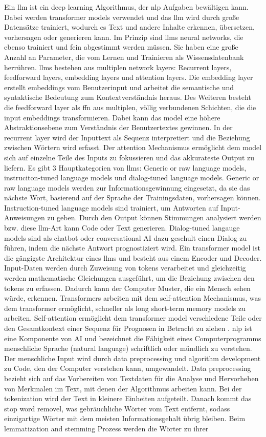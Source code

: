 Ein \gls{llm} ist ein deep learning Algorithmus, der \gls{nlp} Aufgaben bewältigen kann. Dabei werden transformer models verwendet und das \gls{llm} wird durch große Datensätze trainiert, wodurch es Text und andere Inhalte erkennen, übersetzen, vorhersagen oder generieren kann. Im Prinzip sind \gls{llm}s neural networks, die ebenso trainiert und fein abgestimmt werden müssen. Sie haben eine große Anzahl an Parameter, die vom Lernen und Trainieren als Wissensdatenbank herrühren. \gls{llm}s bestehen aus multiplen network layers: Recurrent layers, feedforward layers, embedding layers und attention layers. Die embedding layer erstellt embeddings vom Benutzerinput und arbeitet die semantische und syntaktische Bedeutung zum Kontextverständnis heraus. Des Weiteren besteht die feedforward layer als \gls{ffn} aus multiplen, völlig verbundenen Schichten, die die input embeddings transformieren. Dabei kann das model eine höhere Abstraktionsebene zum Verständnis der Benutzertextes gewinnen. In der recurrent layer wird der Inputtext als Sequenz interpretiert und die Beziehung zwischen Wörtern wird erfasst. Der attention Mechanismus ermöglicht dem model sich auf einzelne Teile des Inputs zu fokussieren und das akkurateste Output zu liefern. Es gibt 3 Hauptkategorien von \gls{llm}s: Generic or raw language models, instruciton-tuned language models und dialog-tuned language models. Generic or raw language models werden zur Informationsgewinnung eingesetzt, da sie das nächste Wort, basierend auf der Sprache der Trainingsdaten, vorhersagen können. Instruction-tuned language models sind trainiert, um Antworten auf Input-Anweisungen zu geben. Durch den Output können Stimmungen analysiert werden bzw. diese \gls{llm}-Art kann Code oder Text generieren. Dialog-tuned langauge models sind als chatbot oder conversational AI dazu geschult einen Dialog zu führen, indem die nächste Antwort prognostiziert wird. Ein transformer model ist die gängigste Architektur eines \gls{llm}s und besteht aus einem Encoder und Decoder. Input-Daten werden durch Zuweisung von tokens verarbeitet und gleichzeitig werden mathematische Gleichungen ausgeführt, um die Beziehung zwischen den tokens zu erfassen. Dadurch kann der Computer Muster, die ein Mensch sehen würde, erkennen. Transformers arbeiten mit dem self-attention Mechanismus, was dem transformer ermöglicht, schneller  als long short-term memory models zu arbeiten. Self-attention ermöglicht dem transformer model verschiedene Teile oder den Gesamtkontext einer Sequenz für Prognosen in Betracht zu ziehen \cite{llm-def}. \gls{nlp} ist eine Komponente von AI und bezeichnet die Fähigkeit eines Computerprogramms menschliche Sprache (natural language) schriftlich oder mündlich zu verstehen. Der menschliche Input wird durch data preprocessing und algorithm development zu Code, den der Computer verstehen kann, umgewandelt. Data preprocessing bezieht sich auf das Vorbereiten von Textdaten für die Analyse und Hervorheben von Merkmalen im Text, mit denen der Algorithmus arbeiten kann. Bei der tokenization wird der Text in kleinere Einheiten aufgeteilt. Danach kommt das stop word removel, was gebräuchliche Wörter vom Text entfernt, sodass einzigartige Wörter mit dem meisten Informationsgehalt übrig bleiben. Beim lemmatization and stemming Prozess werden die Wörter zu ihrer 